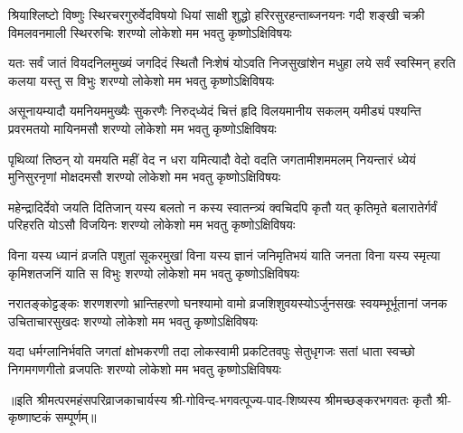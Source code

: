 
\fourlineindentedshloka
{श्रियाश्लिष्टो विष्णुः स्थिरचरगुरुर्वेदविषयो}
{धियां साक्षी शुद्धो हरिरसुरहन्ताब्जनयनः}
{गदी शङ्खी चक्री विमलवनमाली स्थिररुचिः}
{शरण्यो लोकेशो मम भवतु कृष्णोऽक्षिविषयः}

\fourlineindentedshloka
{यतः सर्वं जातं वियदनिलमुख्यं जगदिदं}
{स्थितौ निःशेषं योऽवति निजसुखांशेन मधुहा}
{लये सर्वं स्वस्मिन् हरति कलया यस्तु स विभुः}
{शरण्यो लोकेशो मम भवतु कृष्णोऽक्षिविषयः}

\fourlineindentedshloka
{असूनायम्यादौ यमनियममुख्यैः सुकरणैः}
{निरुद्‌ध्येदं चित्तं हृदि विलयमानीय सकलम्}
{यमीड्यं पश्यन्ति प्रवरमतयो मायिनमसौ}
{शरण्यो लोकेशो मम भवतु कृष्णोऽक्षिविषयः}

\fourlineindentedshloka
{पृथिव्यां तिष्ठन् यो यमयति महीं वेद न धरा}
{यमित्यादौ वेदो वदति जगतामीशममलम्}
{नियन्तारं ध्येयं मुनिसुरनृणां मोक्षदमसौ}
{शरण्यो लोकेशो मम भवतु कृष्णोऽक्षिविषयः}

\fourlineindentedshloka
{महेन्द्रादिर्देवो जयति दितिजान् यस्य बलतो}
{न कस्य स्वातन्त्र्यं क्वचिदपि कृतौ यत् कृतिमृते}
{बलारातेर्गर्वं परिहरति योऽसौ विजयिनः}
{शरण्यो लोकेशो मम भवतु कृष्णोऽक्षिविषयः}

\fourlineindentedshloka
{विना यस्य ध्यानं व्रजति पशुतां सूकरमुखां}
{विना यस्य ज्ञानं जनिमृतिभयं याति जनता}
{विना यस्य स्मृत्या कृमिशतजनिं याति स विभुः}
{शरण्यो लोकेशो मम भवतु कृष्णोऽक्षिविषयः}

\fourlineindentedshloka
{नरातङ्कोट्टङ्कः शरणशरणो भ्रान्तिहरणो}
{घनश्यामो वामो व्रजशिशुवयस्योऽर्जुनसखः}
{स्वयम्भूर्भूतानां जनक उचिताचारसुखदः}
{शरण्यो लोकेशो मम भवतु कृष्णोऽक्षिविषयः}

\fourlineindentedshloka
{यदा धर्मग्लानिर्भवति जगतां क्षोभकरणी}
{तदा लोकस्वामी प्रकटितवपुः सेतुधृगजः}
{सतां धाता स्वच्छो निगमगणगीतो व्रजपतिः}
{शरण्यो लोकेशो मम भवतु कृष्णोऽक्षिविषयः}

॥इति श्रीमत्परमहंसपरिव्राजकाचार्यस्य श्री-गोविन्द-भगवत्पूज्य-पाद-शिष्यस्य
श्रीमच्छङ्करभगवतः कृतौ श्री-कृष्णाष्टकं सम्पूर्णम्॥